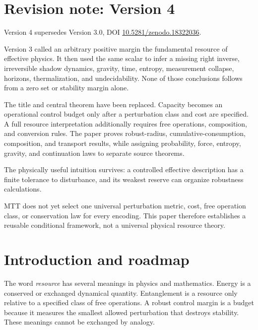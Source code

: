 \documentclass[11pt]{article}
\theoremstyle{definition}
\theoremstyle{remark}
\begin{document}
\section*{Revision note: Version 4}
\begin{description}[leftmargin=2.5cm,style=nextline]
\item[Supersedes]
Version 4 supersedes Version 3.0, DOI
\href{https://doi.org/10.5281/zenodo.18322036}
{10.5281/zenodo.18322036}.

\item[Reason]
Version 3 called an arbitrary positive margin the fundamental resource of
effective physics.  It then used the same scalar to infer a missing right
inverse, irreversible shadow dynamics, gravity, time, entropy, measurement
collapse, horizons, thermalization, and undecidability.  None of those
conclusions follows from a zero set or stability margin alone.

\item[Resolution]
The title and central theorem have been replaced.  Capacity becomes an
operational control budget only after a perturbation class and cost are
specified.  A full resource interpretation additionally requires free
operations, composition, and conversion rules.  The paper proves
robust-radius, cumulative-consumption, composition, and transport results,
while assigning probability, force, entropy, gravity, and continuation laws
to separate source theorems.

\item[Retained content]
The physically useful intuition survives: a controlled effective
description has a finite tolerance to disturbance, and its weakest reserve
can organize robustness calculations.

\item[Remaining boundary]
MTT does not yet select one universal perturbation metric, cost, free
operation class, or conservation law for every encoding.  This paper
therefore establishes a reusable conditional framework, not a universal
physical resource theory.
\end{description}

\tableofcontents

\section{Introduction and roadmap}
\label{sec:intro}

The word \emph{resource} has several meanings in physics and mathematics.
Energy is a conserved or exchanged dynamical quantity.  Entanglement is a
resource only relative to a specified class of free operations.  A robust
control margin is a budget because it measures the smallest allowed
perturbation that destroys stability.  These meanings cannot be exchanged
by analogy.
\end{document}
